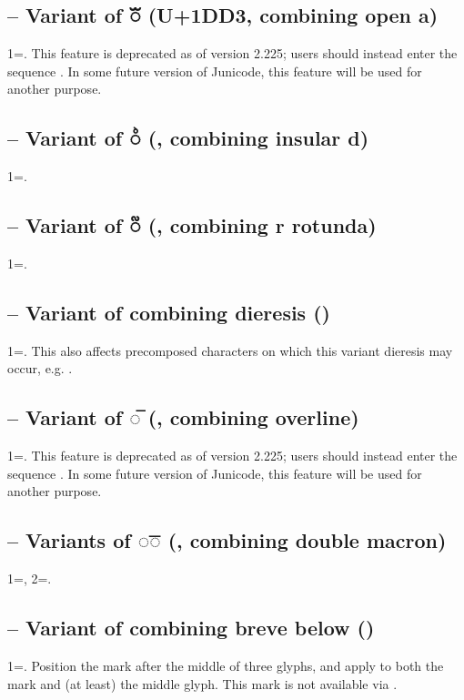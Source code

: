 \subsection{ – Variant of ◌ᷓ (U+1DD3, combining open a)}
1=. This feature is deprecated as of version 2.225; users should instead 
enter the sequence . In some future version of Junicode, this feature will be used 
for another purpose.

\subsection{ – Variant of ◌ᷘ (, combining insular
d)}
1=.

\subsection{ – Variant of ◌᷑ (, combining r rotunda)}
1=.

\subsection{ – Variant of combining dieresis ()}
1=. This also affects precomposed characters on which this variant dieresis may occur, e.g.
.

\subsection{ – Variant of ◌̅ (,
combining overline)}
1=. This feature is deprecated as of version 2.225; users should instead 
enter the sequence .
In some future version of Junicode, this feature will be used for another purpose.

\subsection{ – Variants of ◌͞◌ (, combining double macron)}
1=, 2=.

\subsection{ – Variant of combining breve below ()}
1=. Position the mark after the middle of three glyphs, and apply 
to both the mark and (at least) the middle glyph. This mark is not available via .

